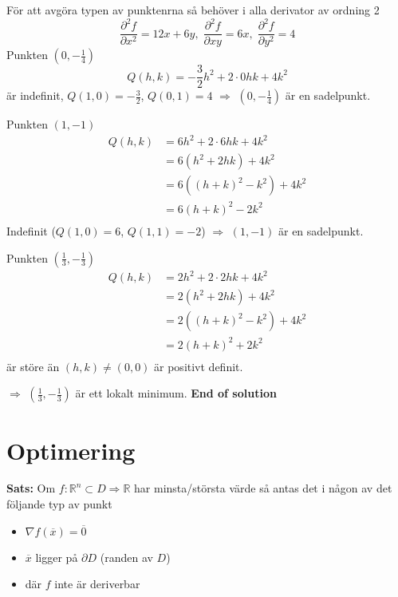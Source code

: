 För att avgöra typen av punktenrna så behöver i alla derivator av ordning 2
\begin{equation*}
    \frac{\partial^2 f}{\partial x^2} = 12x + 6y,\; 
    \frac{\partial^2 f}{\partial xy} = 6x,\;
    \frac{\partial^2 f}{\partial y^2} = 4
\end{equation*}
Punkten $(0,-\frac{1}{4})$
\begin{equation*}
    Q(h,k) = -\frac{3}{2}h^2 + 2\cdot0hk + 4k^2 
\end{equation*}
är indefinit, $Q(1,0)=-\frac{3}{2}$, $Q(0,1)=4$ $\Rightarrow$ $(0,-\frac{1}{4})$ är en sadelpunkt.

Punkten $(1,-1)$
\begin{align*}
    Q(h,k) &= 6h^2 + 2\cdot6hk + 4k^2 \\
    &= 6(h^2 + 2hk) + 4k^2 \\
    &= 6((h+k)^2 -k^2) + 4k^2 \\
    &= 6(h+k)^2 -2k^2 \\
\end{align*}
Indefinit ($Q(1,0)=6$, $Q(1,1)=-2$) $\Rightarrow$ $(1,-1)$ är en sadelpunkt.

Punkten $(\frac{1}{3},-\frac{1}{3})$
\begin{align*}
    Q(h,k) &= 2h^2 + 2\cdot2hk + 4k^2 \\
    &= 2(h^2 + 2hk) + 4k^2 \\
    &= 2((h+k)^2 -k^2) + 4k^2 \\
    &= 2(h+k)^2 +2k^2 \\
\end{align*}
är störe än $(h,k)\neq(0,0)$ är positivt definit.

$\Rightarrow$ $(\frac{1}{3},-\frac{1}{3})$ är ett lokalt minimum.
\textbf{End of solution} 


\section{Optimering}

\textbf{Sats:} Om $f:\mathbb{R}^n\subset D\Rightarrow\mathbb{R}$ har minsta/största 
värde så antas det i någon av det följande typ av punkt
\begin{itemize}
    \item $\nabla f(\overline{x})=\overline{0}$
    \item $\overline{x}$ ligger på $\partial D$ (randen av $D$)
    \item där $f$ inte är deriverbar
\end{itemize}

